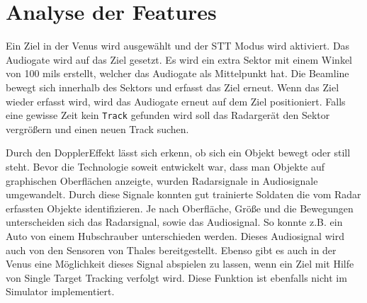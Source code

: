 \chapter{Analyse der Features}
Ein Ziel in der Venus wird ausgewählt und der STT Modus wird aktiviert. Das Audiogate wird auf das Ziel gesetzt. Es wird ein extra Sektor mit einem
Winkel von 100 mils erstellt, welcher das Audiogate als Mittelpunkt hat. Die Beamline bewegt sich innerhalb des Sektors und erfasst das Ziel erneut. Wenn
das Ziel wieder erfasst wird, wird das Audiogate erneut auf dem Ziel positioniert. Falls eine gewisse Zeit kein \texttt{Track} gefunden wird soll das Radargerät
den Sektor vergrößern und einen neuen Track suchen.

Durch den DopplerEffekt lässt sich erkenn, ob sich ein Objekt bewegt oder still steht. Bevor die Technologie soweit entwickelt war, dass man Objekte auf
graphischen Oberflächen anzeigte, wurden Radarsignale in Audiosignale umgewandelt. Durch diese Signale konnten gut trainierte Soldaten die vom Radar 
erfassten Objekte identifizieren. Je nach Oberfläche, Größe und die Bewegungen unterscheiden sich das Radarsignal, sowie das Audiosignal. So konnte z.B.
ein Auto von einem Hubschrauber unterschieden werden. Dieses Audiosignal wird auch von den Sensoren von Thales bereitgestellt. Ebenso gibt es auch in der 
Venus eine Möglichkeit dieses Signal abspielen zu lassen, wenn ein Ziel mit Hilfe von Single Target Tracking verfolgt wird. Diese Funktion ist ebenfalls
nicht im Simulator implementiert. 
